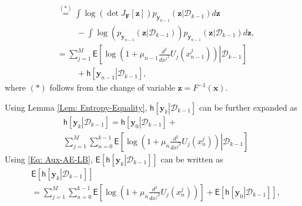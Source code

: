 \documentclass[10pt,twocolumn,twoside]{IEEEtran}
\begin{document}
\begin{IEEEproof}
\begin{align}
&\stackrel{{\left({*}\right)}}{=}\int{\ensuremath{\log{\left({{\det J_{{\ensuremath{\boldsymbol{{F}}}}}\left[{\ensuremath{\boldsymbol{{z}}}}\right]}}\right)}}}p_{{\ensuremath{\boldsymbol{{y}}}}_{n-1}}{\left({{\ensuremath{\boldsymbol{{z}}}}\left|\mathcal{D}_{k-1}\right.}\right)}d{\ensuremath{\boldsymbol{{z}}}}\nonumber\\
&\hspace{1cm}-\int{\ensuremath{\log{\left({{p_{{\ensuremath{\boldsymbol{{y}}}}_{n-1}}{\left({{\ensuremath{\boldsymbol{{z}}}}\left|\mathcal{D}_{k-1}\right.}\right)}}}\right)}}}p_{{\ensuremath{\boldsymbol{{y}}}}_{n-1}}{\left({{\ensuremath{\boldsymbol{{z}}}}\left|\mathcal{D}_{k-1}\right.}\right)}d{\ensuremath{\boldsymbol{{z}}}},\nonumber\\
&=\!\!\sum_{j=1}^M\mathsf{E}\!\left[\left.\!\log\!\!\left(\!1\!+\!\mu_{n-1}\frac{d ^2}{d {x^j}^2}U_{j}\!\!{\left({x^j_{n-1}}\right)}\right)\right|{\mathcal{D}_{k-1}}\right]\nonumber\\
&\hspace{1cm}+{\ensuremath{\mathsf{h}\left[\left.{{\ensuremath{\boldsymbol{{y}}}}_{n-1}}\right|{\mathcal{D}_{k-1}}\right]}},
\end{align}	
where ${\left({*}\right)}$ follows from the change of variable ${\ensuremath{\boldsymbol{{z}}}}=F^{-1}{\left({{\ensuremath{\boldsymbol{{x}}}}}\right)}$.
\end{IEEEproof}
Using Lemma \ref{Lem: Entropy-Equality}, ${\ensuremath{\mathsf{h}\left[\left.{{\ensuremath{\boldsymbol{{y}}}}_{k}}\right|{\mathcal{D}_{k-1}}\right]}}$ can be further expanded as
\begin{align}\label{Eq: Aux-AE-LB}
&{\ensuremath{\mathsf{h}\left[\left.{{\ensuremath{\boldsymbol{{y}}}}_{k}}\right|{\mathcal{D}_{k-1}}\right]}}={\ensuremath{\mathsf{h}\left[\left.{{\ensuremath{\boldsymbol{{y}}}}_{0}}\right|{\mathcal{D}_{k-1}}\right]}}+\nonumber\\
&\sum_{j=1}^M\sum_{n=0}^{k-1}{\ensuremath{\mathsf{E}\left[\left.{{\ensuremath{\log{\left({{1+\mu_n\frac{d ^2}{d {x^j}^2}U_{j}{\left({x^{j}_{n}}\right)}}}\right)}}}}\right|{\mathcal{D}_{k-1}}\right]}}
\end{align}
Using \eqref{Eq: Aux-AE-LB}, ${\ensuremath{\mathsf{E}\left[{{\ensuremath{\mathsf{h}\left[\left.{{\ensuremath{\boldsymbol{{y}}}}_{k}}\right|{\mathcal{D}_{k-1}}\right]}}} \right]}}$ can be written as
\begin{align}\label{Eq: Aux-0}
&{\ensuremath{\mathsf{E}\left[{{\ensuremath{\mathsf{h}\left[\left.{{\ensuremath{\boldsymbol{{y}}}}_{k}}\right|{\mathcal{D}_{k-1}}\right]}}} \right]}}\nonumber\\
&\hspace{0cm}=\sum_{j=1}^M\sum_{n=0}^{k-1}{\ensuremath{\mathsf{E}\left[{{\ensuremath{\log{\left({{1+\mu_n\frac{d ^2}{d {x^j}^2}U_{j}{\left({x^{j}_{n}}\right)}}}\right)}}}} \right]}}+{\ensuremath{\mathsf{E}\left[{{\ensuremath{\mathsf{h}\left[\left.{{\ensuremath{\boldsymbol{{y}}}}_{0}}\right|{\mathcal{D}_{k-1}}\right]}}} \right]}},
\end{align}
\end{document}
